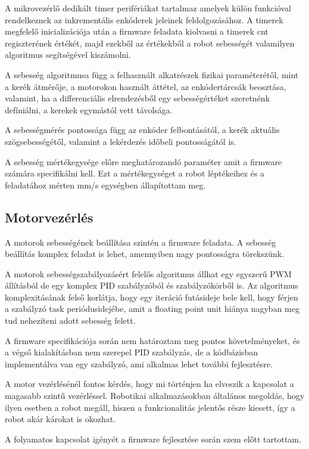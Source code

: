 A mikrovezérlő dedikált timer perifériákat tartalmaz amelyek külön funkcióval
rendelkeznek az inkrementális enkóderek jeleinek feldolgozásához. A timerek
megfelelő inicializációja után a firmware feladata kiolvasni a timerek cnt
regiszterének értékét, majd ezekből az értékekből a robot sebességét valamilyen
algoritmus segítségével kiszámolni.

A sebesség algoritmusa függ a felhasznált alkatrészek fizikai paraméterétől, mint
a kerék átmérője, a motorokon használt áttétel, az enkódertárcsák beosztása,
valamint, ha a differenciális elrendezésből egy sebességértéket szeretnénk
defíniálni, a kerekek egymástól vett távolsága.

A sebességmérés pontossága függ az enkóder felbontásától, a kerék aktuális
szögsebességétől, valamint a lekérdezés időbeli pontosságától is.

A sebesség mértékegysége előre meghatározandó paraméter amit a firmware számára
specifikálni kell. Ezt a mértékegységet a robot léptékeihez és a feladatához
mérten mm/s egységben állapítottam meg.

\subsection{Motorvezérlés}

A motorok sebességének beállítása szintén a firmware feladata. A sebesség
beállítás komplex feladat is lehet, amennyiben nagy pontosságra törekszünk.

A motorok sebességszabályozásért felelős algoritmus állhat egy egyszerű PWM
állításból de egy komplex PID szabályzóból és szabályzókörből is. Az algoritmus
komplexitásának felső korlátja, hogy egy iteráció futásideje bele kell, hogy
férjen a szabályzó task periódusidejébe, amit a floating point unit hiánya
nagyban meg tud nehezíteni adott sebesség felett.

A firmware specifikációja során nem határoztam meg pontos követelményeket, és a
végső kialakításban nem szerepel PID szabályzás, de a kódbázisban implementálva
van egy szabályzó, ami alkalmas lehet további fejlesztésre.

\medskip

A motor vezérlésénél fontos kérdés, hogy mi történjen ha elveszik a kapcsolat a
magasabb szintű vezérléssel. Robotikai alkalmazásokban általános megoldás, hogy
ilyen esetben a robot megáll, hiszen a funkcionalitás jelentős része kiesett, így
a robot akár károkat is okozhat.

A folyamatos kapcsolat igényét a firmware fejlesztése során szem előtt tartottam.

